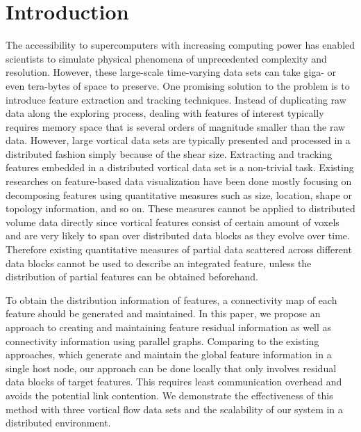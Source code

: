 \documentclass[10pt, conference, compsocconf]{IEEEtran}
\begin{document}
%
\IEEEpeerreviewmaketitle

\section{Introduction}
The accessibility to supercomputers with increasing computing power has enabled scientists to simulate physical phenomena of unprecedented complexity and resolution. However, these large-scale time-varying data sets can take giga- or even tera-bytes of space to preserve. One promising solution to the problem is to introduce feature extraction and tracking techniques. Instead of duplicating raw data along the exploring process, dealing with features of interest typically requires memory space that is several orders of magnitude smaller than the raw data.
However, large vortical data sets are typically presented and processed in a distributed fashion simply because of the shear size. Extracting and tracking features embedded in a distributed vortical data set is a non-trivial task. Existing researches on feature-based data visualization have been done mostly focusing on decomposing features using quantitative measures such as size, location, shape or topology information, and so on. These measures cannot be applied to distributed volume data directly since vortical features consist of certain amount of voxels and are very likely to span over distributed data blocks as they evolve over time. Therefore existing quantitative measures of partial data scattered across different data blocks cannot be used to describe an integrated feature, unless the distribution of partial features can be obtained beforehand.

To obtain the distribution information of features, a connectivity map of each feature should be generated and maintained. In this paper, we propose an approach to creating and maintaining feature residual information as well as connectivity information using parallel graphs. Comparing to the existing approaches, which generate and maintain the global feature information in a single host node, our approach can be done locally that only involves residual data blocks of target features. This requires least communication overhead and avoids the potential link contention. We demonstrate the effectiveness of this method with three vortical flow data sets and the scalability of our system in a distributed environment.
\end{document}
